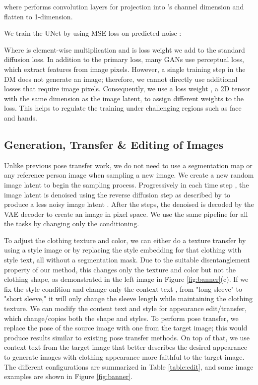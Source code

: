 \documentclass[10pt,twocolumn,letterpaper]{article}
\begin{document}
where  performs  convolution layers for projection into 's channel dimension  and flatten to 1-dimension.
\vspace{-2mm}

\vspace{-2mm}
We train the UNet by using MSE loss on predicted noise :

Where  is element-wise multiplication and  is loss weight we add to the standard diffusion loss. In addition to the primary loss, many GANs\cite{pise, gfla, casd, nted} use perceptual loss\cite{perceptual_loss}, which extract features from image pixels. However, a single training step in the DM does not generate an image; therefore, we cannot directly use additional losses that require image pixels. Consequently, we use a loss weight , a 2D tensor with the same dimension as the image latent, to assign different weights to the loss. This helps to regulate the training under challenging regions such as face and hands.

\subsection{Generation, Transfer \& Editing of Images}
Unlike previous pose transfer work, we do not need to use a segmentation map or any reference person image when sampling a new image. We create a new random image latent  to begin the sampling process. Progressively in each time step , the image latent is denoised using the reverse diffusion step as described by \cite{diffusion_model} to produce a less noisy image latent . After the  steps, the denoised  is decoded by the VAE decoder  to create an image in pixel space. We use the same pipeline for all the tasks by changing only the conditioning.

To adjust the clothing texture and color, we can either do a texture transfer by using a style image or by replacing the style embedding for that clothing with style text, all without a segmentation mask. Due to the suitable disentanglement property of our method, this changes only the texture and color but not the clothing shape, as demonstrated in the left image in Figure \ref{fig:banner}(c). If we fix the style condition and change only the context text \eg, from "long sleeve" to "short sleeve," it will only change the sleeve length while maintaining the clothing texture. We can modify the content text and style for appearance edit/transfer, which change/copies both the shape and styles. To perform pose transfer, we replace the pose of the source image with one from the target image; this would produce results similar to existing pose transfer methods. On top of that, we use context text from the target image that better describes the desired appearance to generate images with clothing appearance more faithful to the target image. The different configurations are summarized in Table \ref{table:edit}, and some image examples are shown in Figure \ref{fig:banner}.
\end{document}
